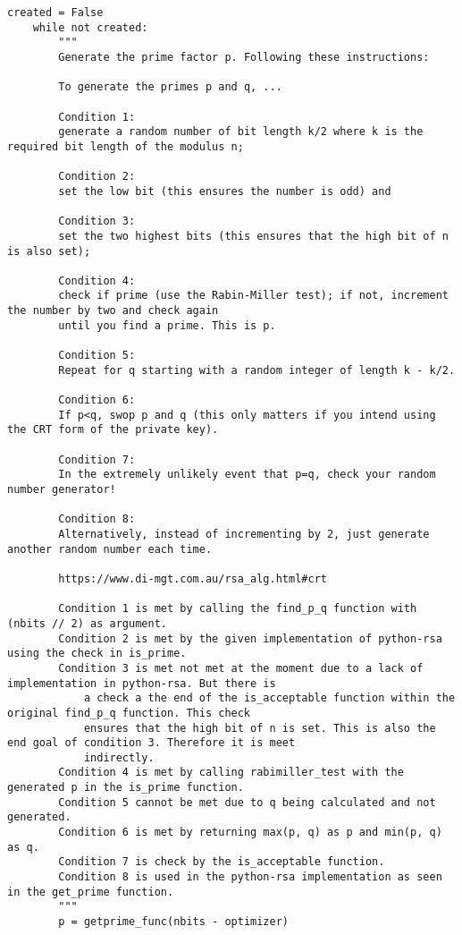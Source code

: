 \begin{lstlisting}[language=PyBrIM]
    created = False
    while not created:
        """
        Generate the prime factor p. Following these instructions:
        
        To generate the primes p and q, ...
        
        Condition 1: 
        generate a random number of bit length k/2 where k is the required bit length of the modulus n; 
        
        Condition 2:
        set the low bit (this ensures the number is odd) and 
        
        Condition 3:
        set the two highest bits (this ensures that the high bit of n is also set); 
        
        Condition 4:
        check if prime (use the Rabin-Miller test); if not, increment the number by two and check again 
        until you find a prime. This is p. 
        
        Condition 5:
        Repeat for q starting with a random integer of length k - k/2. 
        
        Condition 6:
        If p<q, swop p and q (this only matters if you intend using the CRT form of the private key).
        
        Condition 7: 
        In the extremely unlikely event that p=q, check your random number generator! 
        
        Condition 8: 
        Alternatively, instead of incrementing by 2, just generate another random number each time.
    
        https://www.di-mgt.com.au/rsa_alg.html#crt
        
        Condition 1 is met by calling the find_p_q function with (nbits // 2) as argument.
        Condition 2 is met by the given implementation of python-rsa using the check in is_prime.
        Condition 3 is met not met at the moment due to a lack of implementation in python-rsa. But there is 
            a check a the end of the is_acceptable function within the original find_p_q function. This check 
            ensures that the high bit of n is set. This is also the end goal of condition 3. Therefore it is meet 
            indirectly.
        Condition 4 is met by calling rabimiller_test with the generated p in the is_prime function.
        Condition 5 cannot be met due to q being calculated and not generated. 
        Condition 6 is met by returning max(p, q) as p and min(p, q) as q.
        Condition 7 is check by the is_acceptable function.
        Condition 8 is used in the python-rsa implementation as seen in the get_prime function.
        """
        p = getprime_func(nbits - optimizer)


\end{lstlisting}
